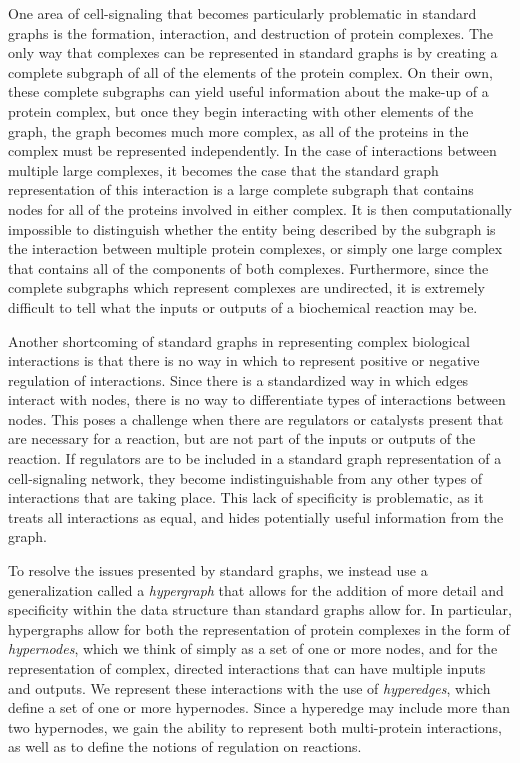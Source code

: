 \documentclass[12pt,twoside]{reedthesis}
\theoremstyle{definition}
\begin{document}
One area of cell-signaling that becomes particularly problematic in standard graphs is the formation, interaction, and destruction of protein complexes.  The only way that complexes can be represented in standard graphs is by creating a complete subgraph of all of the elements of the protein complex.  On their own, these complete subgraphs can yield useful information about the make-up of a protein complex, but once they begin interacting with other elements of the graph, the graph becomes much more complex, as all of the proteins in the complex must be represented independently.  In the case of interactions between multiple large complexes, it becomes the case that the standard graph representation of this interaction is a large complete subgraph that contains nodes for all of the proteins involved in either complex.  It is then computationally impossible to distinguish whether the entity being described by the subgraph is the interaction between multiple protein complexes, or simply one large complex that contains all of the components of both complexes.  Furthermore, since the complete subgraphs which represent complexes are undirected, it is extremely difficult to tell what the inputs or outputs of a biochemical reaction may be.\par

Another shortcoming of standard graphs in representing complex biological interactions is that there is no way in which to represent positive or negative regulation of interactions.  Since there is a standardized way in which edges interact with nodes, there is no way to differentiate types of interactions between nodes.  This poses a challenge when there are regulators or catalysts present that are necessary for a reaction, but are not part of the inputs or outputs of the reaction.  If regulators are to be included in a standard graph representation of a cell-signaling network, they become indistinguishable from any other types of interactions that are taking place.  This lack of specificity is problematic, as it treats all interactions as equal, and hides potentially useful information from the graph.\par

To resolve the issues presented by standard graphs, we instead use a generalization called a \textit{hypergraph} that allows for the addition of more detail  and specificity within the data structure than standard graphs allow for.  In particular, hypergraphs allow for both the representation of protein complexes in the form of \textit{hypernodes}, which we think of simply as a set of one or more nodes, and for the representation of complex, directed interactions that can have multiple inputs and outputs.  We represent these interactions with the use of \textit{hyperedges}, which define a set of one or more hypernodes.  Since a hyperedge may include more than two hypernodes, we gain the ability to represent both multi-protein interactions, as well as to define the notions of regulation on reactions.\par
\end{document}
